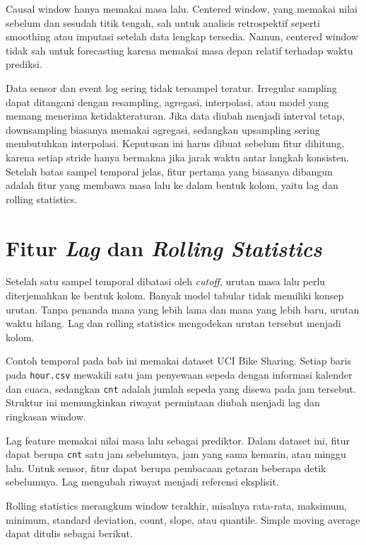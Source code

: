 Causal window hanya memakai masa lalu. Centered window, yang memakai nilai sebelum dan sesudah titik tengah, sah untuk analisis retrospektif seperti smoothing atau imputasi setelah data lengkap tersedia. Namun, centered window tidak sah untuk forecasting karena memakai masa depan relatif terhadap waktu prediksi.

Data sensor dan event log sering tidak tersampel teratur. Irregular sampling dapat ditangani dengan resampling, agregasi, interpolasi, atau model yang memang menerima ketidakteraturan. Jika data diubah menjadi interval tetap, downsampling biasanya memakai agregasi, sedangkan upsampling sering membutuhkan interpolasi. Keputusan ini harus dibuat sebelum fitur dihitung, karena setiap stride hanya bermakna jika jarak waktu antar langkah konsisten. Setelah batas sampel temporal jelas, fitur pertama yang biasanya dibangun adalah fitur yang membawa masa lalu ke dalam bentuk kolom, yaitu lag dan rolling statistics.

\section{\texorpdfstring{Fitur \emph{Lag} dan \emph{Rolling Statistics}}{Fitur Lag dan Rolling Statistics}}\label{fitur-lag-dan-rolling-statistics}

Setelah satu sampel temporal dibatasi oleh \emph{cutoff}, urutan masa lalu perlu diterjemahkan ke bentuk kolom. Banyak model tabular tidak memiliki konsep urutan. Tanpa penanda mana yang lebih lama dan mana yang lebih baru, urutan waktu hilang. Lag dan rolling statistics mengodekan urutan tersebut menjadi kolom.

Contoh temporal pada bab ini memakai dataset UCI Bike Sharing. Setiap baris pada \passthrough{\lstinline!hour.csv!} mewakili satu jam penyewaan sepeda dengan informasi kalender dan cuaca, sedangkan \passthrough{\lstinline!cnt!} adalah jumlah sepeda yang disewa pada jam tersebut. Struktur ini memungkinkan riwayat permintaan diubah menjadi lag dan ringkasan window.

Lag feature memakai nilai masa lalu sebagai prediktor. Dalam dataset ini, fitur dapat berupa \passthrough{\lstinline!cnt!} satu jam sebelumnya, jam yang sama kemarin, atau minggu lalu. Untuk sensor, fitur dapat berupa pembacaan getaran beberapa detik sebelumnya. Lag mengubah riwayat menjadi referensi eksplisit.

Rolling statistics merangkum window terakhir, misalnya rata-rata, maksimum, minimum, standard deviation, count, slope, atau quantile. Simple moving average dapat ditulis sebagai berikut.

